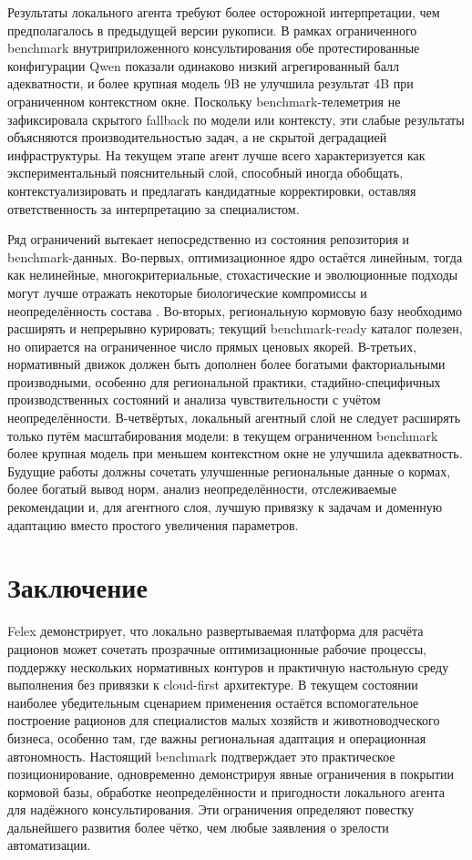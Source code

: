 \documentclass[a4paper,fleqn]{cas-sc}
\begin{document}
Результаты локального агента требуют более осторожной интерпретации, чем предполагалось в предыдущей версии рукописи. В рамках ограниченного benchmark внутриприложенного консультирования обе протестированные конфигурации Qwen показали одинаково низкий агрегированный балл адекватности, и более крупная модель 9B не улучшила результат 4B при ограниченном контекстном окне. Поскольку benchmark-телеметрия не зафиксировала скрытого fallback по модели или контексту, эти слабые результаты объясняются производительностью задач, а не скрытой деградацией инфраструктуры. На текущем этапе агент лучше всего характеризуется как экспериментальный пояснительный слой, способный иногда обобщать, контекстуализировать и предлагать кандидатные корректировки, оставляя ответственность за интерпретацию за специалистом.

Ряд ограничений вытекает непосредственно из состояния репозитория и benchmark-данных. Во-первых, оптимизационное ядро остаётся линейным, тогда как нелинейные, многокритериальные, стохастические и эволюционные подходы могут лучше отражать некоторые биологические компромиссы и неопределённость состава \citep{li2022nonlinear, uyeh2018, uyeh2019, das2023, agrawal2025, kumar2025}. Во-вторых, региональную кормовую базу необходимо расширять и непрерывно курировать; текущий benchmark-ready каталог полезен, но опирается на ограниченное число прямых ценовых якорей. В-третьих, нормативный движок должен быть дополнен более богатыми факториальными производными, особенно для региональной практики, стадийно-специфичных производственных состояний и анализа чувствительности с учётом неопределённости. В-четвёртых, локальный агентный слой не следует расширять только путём масштабирования модели: в текущем ограниченном benchmark более крупная модель при меньшем контекстном окне не улучшила адекватность. Будущие работы должны сочетать улучшенные региональные данные о кормах, более богатый вывод норм, анализ неопределённости, отслеживаемые рекомендации и, для агентного слоя, лучшую привязку к задачам и доменную адаптацию вместо простого увеличения параметров.

\section{Заключение}\label{sec:conclusion}

Felex демонстрирует, что локально развертываемая платформа для расчёта рационов может сочетать прозрачные оптимизационные рабочие процессы, поддержку нескольких нормативных контуров и практичную настольную среду выполнения без привязки к cloud-first архитектуре. В текущем состоянии наиболее убедительным сценарием применения остаётся вспомогательное построение рационов для специалистов малых хозяйств и животноводческого бизнеса, особенно там, где важны региональная адаптация и операционная автономность. Настоящий benchmark подтверждает это практическое позиционирование, одновременно демонстрируя явные ограничения в покрытии кормовой базы, обработке неопределённости и пригодности локального агента для надёжного консультирования. Эти ограничения определяют повестку дальнейшего развития более чётко, чем любые заявления о зрелости автоматизации.
\end{document}
